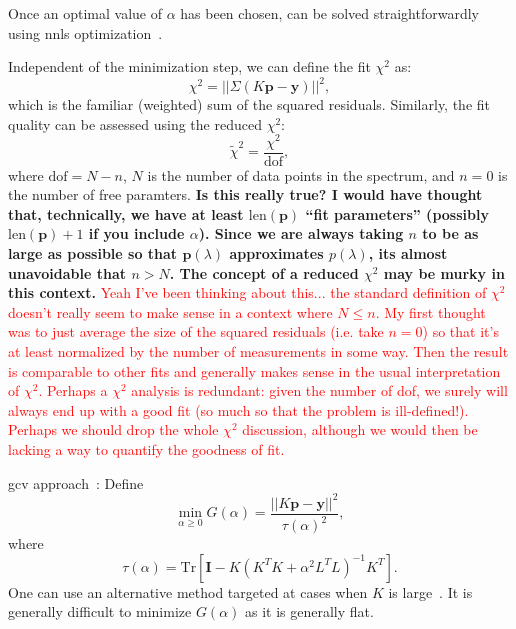Once an optimal value of $\alpha$ has been chosen,  can be solved straightforwardly using \gls{nnls} optimization~\cite{1995-Lawson-SLSP}.



Independent of the minimization step, we can define the fit $\chi^{2}$ as:
\begin{equation} \label{eq:chi2}
   \chi^{2} = || \Sigma \left ( K \mathbf{p} - \mathbf{y} \right ) ||^{2} ,
\end{equation}
which is the familiar (weighted) sum of the squared residuals.
Similarly, the fit quality can be assessed using the reduced $\chi^{2}$:
\begin{equation} \label{eq:reduced-chi2}
   \tilde{\chi}^{2} = \frac{ \chi^{2} }{ \mathrm{dof} },
\end{equation}
where $\mathrm{dof} = N - n$, $N$ is the number of data points in the spectrum, and $n = 0$ is the number of free paramters.
\textbf{%
Is this really true?
I would have thought that, technically, we have at least $\mathrm{len} ( \mathbf{p} )$ ``fit parameters'' (possibly $\mathrm{len} ( \mathbf{p} ) + 1$ if you include $\alpha$).
Since we are always taking $n$ to be as large as possible so that $\mathbf{p} ( \lambda )$ approximates $p ( \lambda )$, its almost unavoidable that $n > N$.
The concept of a reduced $\chi^{2}$ may be murky in this context.
}
\textcolor{red}{Yeah I've been thinking about this... the standard definition of $\chi^2$ doesn't really seem to make sense in a context where $N\leq n$. My first thought was to just average the size of the squared residuals (i.e. take $n=0$) so that it's at least normalized by the number of measurements in some way. Then the result is comparable to other fits and generally makes sense in the usual interpretation of $\chi^2$. Perhaps a $\chi^2$ analysis is redundant: given the number of dof, we surely will always end up with a good fit (so much so that the problem is ill-defined!). Perhaps we should drop the whole $\chi^2$ discussion, although we would then be lacking a way to quantify the goodness of fit. }


\gls{gcv} approach~\cite{1978-Craven-NM-31-377}:
Define
\begin{equation}
\label{eq:gcv}
   \min_{\alpha \geq 0} G ( \alpha ) = \frac{ || K \mathbf{p} - \mathbf{y} ||^{2} }{ \tau ( \alpha )^{2} } ,
\end{equation}
where
\begin{equation}
   \tau ( \alpha ) = \mathrm{Tr} \left [ \mathbf{I} - K \left ( K^{T} K + \alpha^{2} L^{T} L \right )^{-1} K^{T} \right ] .
\end{equation}
One can use an alternative method targeted at cases when $K$ is large~\cite{1997-Golub-JCGS-6-1}.
It is generally difficult to minimize $G ( \alpha )$ as it is generally flat.



